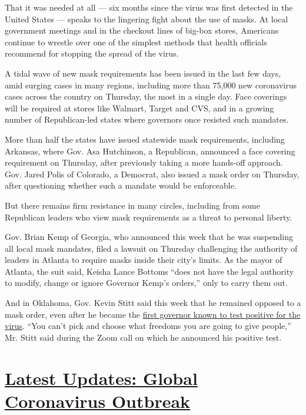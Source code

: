 That it was needed at all --- six months since the virus was first
detected in the United States --- speaks to the lingering fight about
the use of masks. At local government meetings and in the checkout lines
of big-box stores, Americans continue to wrestle over one of the
simplest methods that health officials recommend for stopping the spread
of the virus.

A tidal wave of new mask requirements has been issued in the last few
days, amid surging cases in many regions, including more than 75,000 new
coronavirus cases across the country on Thursday, the most in a single
day. Face coverings will be required at stores like Walmart, Target and
CVS, and in a growing number of Republican-led states where governors
once resisted such mandates.

More than half the states have issued statewide mask requirements,
including Arkansas, where Gov. Asa Hutchinson, a Republican, announced a
face covering requirement on Thursday, after previously taking a more
hands-off approach. Gov. Jared Polis of Colorado, a Democrat, also
issued a mask order on Thursday, after questioning whether such a
mandate would be enforceable.

But there remains firm resistance in many circles, including from some
Republican leaders who view mask requirements as a threat to personal
liberty.

Gov. Brian Kemp of Georgia, who announced this week that he was
suspending all local mask mandates, filed a lawsuit on Thursday
challenging the authority of leaders in Atlanta to require masks inside
their city's limits. As the mayor of Atlanta, the suit said, Keisha
Lance Bottoms ``does not have the legal authority to modify, change or
ignore Governor Kemp's orders,'' only to carry them out.

And in Oklahoma, Gov. Kevin Stitt said this week that he remained
opposed to a mask order, even after he became the
\href{https://www.nytimes.com/2020/07/15/us/oklahoma-governor-coronavirus-stitt.html}{first
governor known to test positive for the virus}. ``You can't pick and
choose what freedoms you are going to give people,'' Mr. Stitt said
during the Zoom call on which he announced his positive test.

\hypertarget{latest-updates-global-coronavirus-outbreak}{%
\section{\texorpdfstring{\href{https://www.nytimes.com/2020/08/01/world/coronavirus-covid-19.html?action=click\&pgtype=Article\&state=default\&region=MAIN_CONTENT_1\&context=storylines_live_updates}{Latest
Updates: Global Coronavirus
Outbreak}}{Latest Updates: Global Coronavirus Outbreak}}\label{latest-updates-global-coronavirus-outbreak}}

